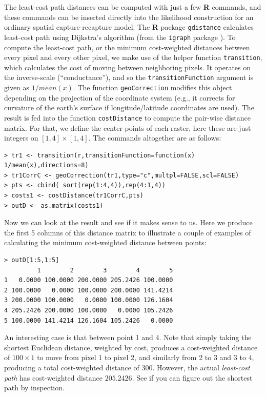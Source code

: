 The least-cost path distances can be
computed with just a few {\bf R} commands, and these commands can
be inserted directly into the likelihood construction for an ordinary
spatial capture-recapture model. The {\bf R} package
\mbox{\tt gdistance} calculates least-cost path using  Dijkstra's algorithm
\citep{dijkstra:1959} (from the \mbox{\tt igraph} package
\citep{csardi:2010}).
To compute the least-cost path, or the minimum cost-weighted distances
between every pixel and every other pixel, we make use of the helper
function \mbox{\tt transition}, which calculates the cost of moving
between neighboring pixels.  It operates on the inverse-scale
(``conductance''), and so the \mbox{\tt transitionFunction} argument
is given as $1/mean(x)$.  The function \mbox{\tt geoCorrection}
modifies this object depending on the projection of the coordinate
system (e.g., it corrects for curvature of the earth's surface if
longitude/latitude coordinates are used).  The result is fed into the
function \mbox{\tt costDistance} to compute the pair-wise distance
matrix. For that, we define the center points of each raster, here
these are just integers on $[1,4] \times [1,4]$.  The commands
altogether are as follows: {\small
\begin{verbatim}
> tr1 <- transition(r,transitionFunction=function(x) 1/mean(x),directions=8)
> tr1CorrC <- geoCorrection(tr1,type="c",multpl=FALSE,scl=FALSE)
> pts <- cbind( sort(rep(1:4,4)),rep(4:1,4))
> costs1 <- costDistance(tr1CorrC,pts)
> outD <- as.matrix(costs1)
\end{verbatim}
}
Now we can look at the result and see if it makes sense to us. Here we
produce the first 5 columns of this distance matrix to illustrate a
couple of examples of calculating the minimum cost-weighted distance
between points:
\begin{center}
{\small
\begin{verbatim}
> outD[1:5,1:5]
         1        2        3        4        5
1   0.0000 100.0000 200.0000 205.2426 100.0000
2 100.0000   0.0000 100.0000 200.0000 141.4214
3 200.0000 100.0000   0.0000 100.0000 126.1604
4 205.2426 200.0000 100.0000   0.0000 105.2426
5 100.0000 141.4214 126.1604 105.2426   0.0000
\end{verbatim}
}
\end{center}
An interesting case is that between point 1 and 4. Note that simply
taking the shortest Euclidean distance, weighted by cost, produces a
cost-weighted distance of $100 \times 1$ to move from pixel 1 to pixel
2, and similarly from 2 to 3 and 3 to 4, producing a total
cost-weighted distance of $300$. However, the actual {\it least-cost
  path} has cost-weighted distance $205.2426$. See if you can figure
out the shortest path by inspection.

